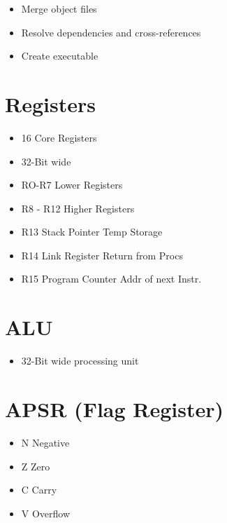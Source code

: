 \documentclass[10pt]{article}
\begin{document}
\begin{itemize}
  \item Merge object files
  \item Resolve dependencies and cross-references
  \item Create executable
\end{itemize}

\section*{Registers}
\begin{itemize}
  \item 16 Core Registers
  \item 32-Bit wide
  \item RO-R7 Lower Registers
  \item R8 - R12 Higher Registers
  \item R13 Stack Pointer Temp Storage
  \item R14 Link Register Return from Procs
  \item R15 Program Counter Addr of next Instr.
\end{itemize}

\section*{ALU}
\begin{itemize}
  \item 32-Bit wide processing unit
\end{itemize}

\section*{APSR (Flag Register)}
\begin{itemize}
  \item N Negative
  \item Z Zero
  \item C Carry
  \item V Overflow
\end{itemize}
\end{document}
